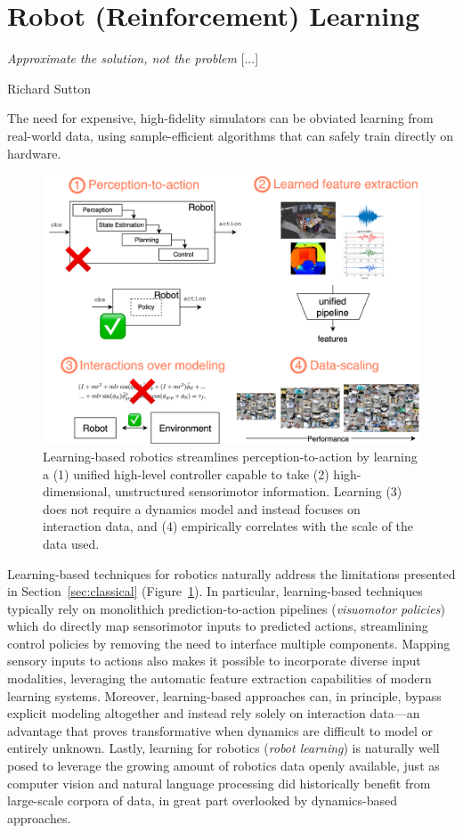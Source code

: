 \section{Robot (Reinforcement) Learning}
\label{sec:learning-rl}

\epigraph{\textit{Approximate the solution, not the problem} [...]}{Richard Sutton}

\begin{tldr}
The need for expensive, high-fidelity simulators can be obviated learning from real-world data, using sample-efficient algorithms that can safely train directly on hardware.
\end{tldr}

\begin{figure}
    \centering
    \includegraphics[width=0.9\linewidth]{figures/ch3/ch3-learning-benefits.pdf}
    \caption{Learning-based robotics streamlines perception-to-action by learning a (1) unified high-level controller capable to take (2) high-dimensional, unstructured sensorimotor information. Learning (3) does not require a dynamics model and instead focuses on interaction data, and (4) empirically correlates with
    the scale of the data used.
    }
    \label{fig:robot-learning-upsides}
\end{figure}

Learning-based techniques for robotics naturally address the limitations presented in Section~\ref{sec:classical} (Figure~\ref{fig:robot-learning-upsides}).
In particular, learning-based techniques typically rely on monolithich prediction-to-action pipelines (\emph{visuomotor policies}) which do directly map sensorimotor inputs to predicted actions, streamlining control policies by removing the need to interface multiple components.
Mapping sensory inputs to actions also makes it possible to incorporate diverse input modalities, leveraging the automatic feature extraction capabilities of modern learning systems. 
Moreover, learning-based approaches can, in principle, bypass explicit modeling altogether and instead rely solely on interaction data---an advantage that proves transformative when dynamics are difficult to model or entirely unknown.
Lastly, learning for robotics (\emph{robot learning}) is naturally well posed to leverage the growing amount of robotics data openly available, just as computer vision and natural language processing did historically benefit from large-scale corpora of data, in great part overlooked by dynamics-based approaches.

